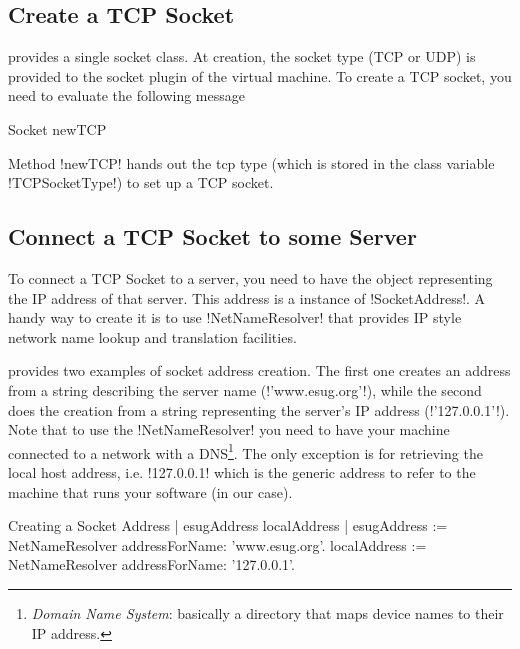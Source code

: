 \documentclass[a4paper,10pt,twoside]{book}
\begin{document}
\subsection{Create a TCP Socket}
\pharo provides a single socket class.
At creation, the socket type (TCP or UDP) is provided to the socket plugin of the virtual machine.
To create a TCP socket, you need to evaluate the following message 
\begin{code}{}
Socket newTCP
\end{code}
Method \ct!newTCP! hands out the tcp type (which is stored in the class variable \ct!TCPSocketType!) to set up a TCP socket.

\subsection{Connect a TCP Socket to some Server}
To connect a TCP Socket to a server, you need to have the object representing the IP address of that server. This address is a instance of \ct!SocketAddress!.
A handy way to create it is to use \ct!NetNameResolver! that  provides IP style network name lookup and translation facilities.

 provides two examples of socket address creation.
The first one creates an address from a string describing the server name (\ct!'www.esug.org'!), while the second does the creation from a string representing the server's IP address (\ct!'127.0.0.1'!).
Note that to use the \ct!NetNameResolver! you need to have your machine connected to a network with a DNS\footnote{\emph{Domain Name System}: basically a directory that maps device names to their IP address.}.
The only exception is for retrieving the local host address, i.e. \ct!127.0.0.1! which is the generic address to refer to the machine that runs your software (\pharo in our case).


\begin{script}[creatingSocketAddress]{Creating a Socket Address}
| esugAddress localAddress |
esugAddress := NetNameResolver addressForName: 'www.esug.org'.
localAddress := NetNameResolver addressForName: '127.0.0.1'.
\end{script}
\end{document}
